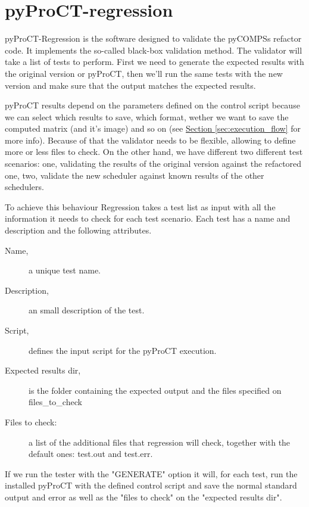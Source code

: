 \chapter{pyProCT-regression}


pyProCT-Regression is the software designed to validate the pyCOMPSs refactor code. It implements the so-called black-box validation method. The validator will take a list of tests to perform. First we need to generate the expected results with the original version or pyProCT, then we'll run the same tests with the new version and make sure that the output matches the expected results.


pyProCT results depend on the parameters defined on the control script because we can select which results to save, which format, wether we want to save the computed matrix (and it's image) and so on (see \hyperref[sec:execution_flow]{Section \ref{sec:execution_flow}} for more info). Because of that the validator needs to be flexible, allowing to define more or less files to check. On the other hand, we have different two different test scenarios: one, validating the results of the original version against the refactored one, two, validate the new scheduler against known results of the other schedulers.

To achieve this behaviour Regression takes a test list as input with all the information it needs to check for each test scenario. 
Each test has a name and description and the following attributes.

\begin{description}
\item [Name,] a unique test name.
\item [Description,] an small description of the test.
\item [Script,] defines the input script for the pyProCT execution. 
\item [Expected results dir,] is the folder containing the expected output and the files specified on files\_to\_check
\item [Files to check:] a list of the additional files that regression will check, together with the default ones: test.out and test.err.
\end{description}

If we run the tester with the "GENERATE" option it will, for each test, run the installed pyProCT with the defined control script and save the normal standard output and error as well as the "files to check" on the "expected results dir".

